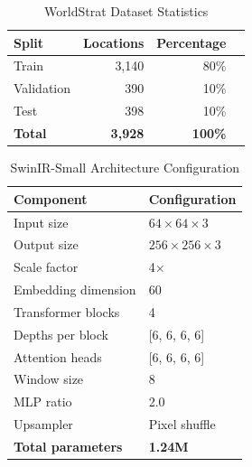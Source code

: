 
\begin{table}[h]
\centering
\caption{WorldStrat Dataset Statistics}
\label{tab:dataset}
\begin{tabular}{lrrr}
\toprule
\textbf{Split} & \textbf{Locations} & \textbf{Percentage} \\
\midrule
Train & 3,140 & 80\% \\
Validation & 390 & 10\% \\
Test & 398 & 10\% \\
\midrule
\textbf{Total} & \textbf{3,928} & \textbf{100\%} \\
\bottomrule
\end{tabular}
\end{table}

\begin{table}[h]
\centering
\caption{SwinIR-Small Architecture Configuration}
\label{tab:architecture}
\begin{tabular}{ll}
\toprule
\textbf{Component} & \textbf{Configuration} \\
\midrule
Input size & $64 \times 64 \times 3$ \\
Output size & $256 \times 256 \times 3$ \\
Scale factor & 4$\times$ \\
Embedding dimension & 60 \\
Transformer blocks & 4 \\
Depths per block & [6, 6, 6, 6] \\
Attention heads & [6, 6, 6, 6] \\
Window size & 8 \\
MLP ratio & 2.0 \\
Upsampler & Pixel shuffle \\
\midrule
\textbf{Total parameters} & \textbf{1.24M} \\
\bottomrule
\end{tabular}
\end{table}

